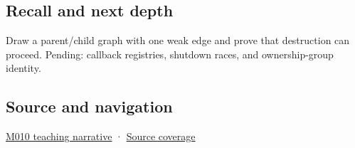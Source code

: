 \subsection{Recall and next depth}\label{appendix-b9548675eb2b-recall-and-next-depth}

Draw a parent/child graph with one weak edge and prove that destruction can proceed. Pending: callback registries, shutdown races, and ownership-group identity.

\subsection{Source and navigation}\label{appendix-b9548675eb2b-source-and-navigation}

\hyperref[01-foundations-i-ch004-weak-observation-breaks-cycles-without-pretending-an-object-is-alive]{M010 teaching narrative} · \hyperref[appendix-fd090d982a15-m010---parts-148-160]{Source coverage}
